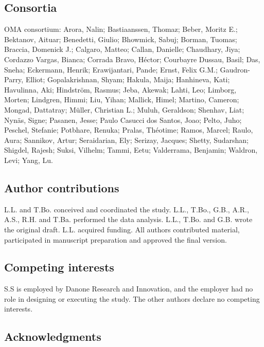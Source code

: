 \documentclass[
  sn-nature,
]{sn-jnl}
\begin{document}
\renewcommand{\bibsection}{}


\subsection{Consortia}\label{sec-consortium}

OMA consortium: Arora, Nalin; Bastiaanssen, Thomaz; Beber, Moritz E.;
Bektanov, Aituar; Benedetti, Giulio; Bhowmick, Sabuj; Borman, Tuomas;
Braccia, Domenick J.; Calgaro, Matteo; Callan, Danielle; Chaudhary,
Jiya; Cordazzo Vargas, Bianca; Corrada Bravo, Héctor; Courbayre Dussau,
Basil; Das, Sneha; Eckermann, Henrik; Erawijantari, Pande; Ernst, Felix
G.M.; Gaudron-Parry, Elliot; Gopalakrishnan, Shyam; Hakula, Maija;
Hanhineva, Kati; Havulinna, Aki; Hindström, Rasmus; Jeba, Akewak; Lahti,
Leo; Limborg, Morten; Lindgren, Himmi; Liu, Yihan; Mallick, Himel;
Martino, Cameron; Mongad, Dattatray; Müller, Christian L.; Muluh,
Geraldson; Shenhav, Liat; Nynäs, Signe; Pasanen, Jesse; Paulo Casucci
dos Santos, Joao; Pelto, Juho; Peschel, Stefanie; Potbhare, Renuka;
Pralas, Théotime; Ramos, Marcel; Raulo, Aura; Sannikov, Artur;
Seraidarian, Ely; Serizay, Jacques; Shetty, Sudarshan; Shigdel, Rajesh;
Suksi, Vilhelm; Tammi, Eetu; Valderrama, Benjamin; Waldron, Levi; Yang,
Lu.

\subsection{Author contributions}\label{sec-contributions}

L.L. and T.Bo. conceived and coordinated the study. L.L., T.Bo., G.B.,
A.R., A.S., R.H. and T.Ba. performed the data analysis. L.L., T.Bo. and
G.B. wrote the original draft. L.L. acquired funding. All authors
contributed material, participated in manuscript preparation and
approved the final version.

\subsection{Competing interests}\label{sec-interests}

S.S is employed by Danone Research and Innovation, and the employer had
no role in designing or executing the study. The other authors declare
no competing interests.

\subsection{Acknowledgments}\label{sec-acknowledgments}
\end{document}
